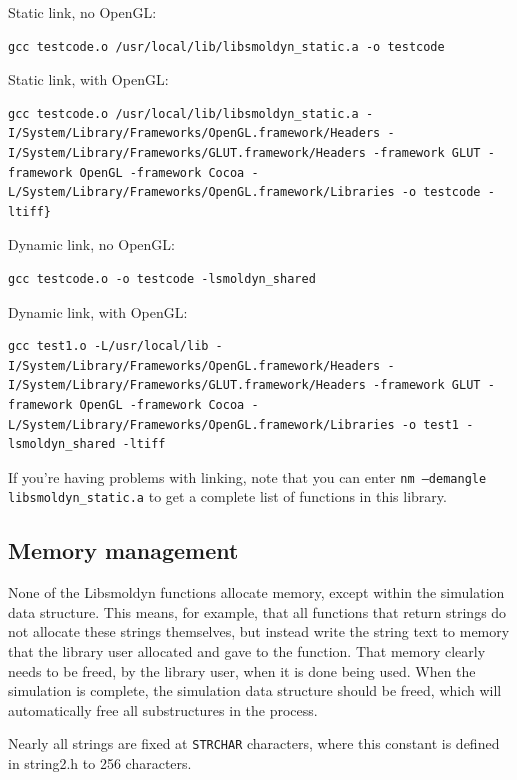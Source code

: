 \documentclass {scrbook}
\newcommand {\ttt} {\texttt}
\begin{document}
Static link, no OpenGL:
\begin{lstlisting}[style=SSAC]
gcc testcode.o /usr/local/lib/libsmoldyn_static.a -o testcode
\end{lstlisting}

Static link, with OpenGL:
\begin{lstlisting}[style=SSAC]
gcc testcode.o /usr/local/lib/libsmoldyn_static.a -I/System/Library/Frameworks/OpenGL.framework/Headers -I/System/Library/Frameworks/GLUT.framework/Headers -framework GLUT -framework OpenGL -framework Cocoa -L/System/Library/Frameworks/OpenGL.framework/Libraries -o testcode -ltiff}
\end{lstlisting}

Dynamic link, no OpenGL:
\begin{lstlisting}[style=SSAC]
gcc testcode.o -o testcode -lsmoldyn_shared
\end{lstlisting}

Dynamic link, with OpenGL:
\begin{lstlisting}[style=SSAC]
gcc test1.o -L/usr/local/lib -I/System/Library/Frameworks/OpenGL.framework/Headers -I/System/Library/Frameworks/GLUT.framework/Headers -framework GLUT -framework OpenGL -framework Cocoa -L/System/Library/Frameworks/OpenGL.framework/Libraries -o test1 -lsmoldyn_shared -ltiff
\end{lstlisting}

If you're having problems with linking, note that you can enter \ttt{nm --demangle libsmoldyn\_static.a} to get a complete list of functions in this library.

\subsection*{Memory management}

None of the Libsmoldyn functions allocate memory, except within the simulation data structure. This means, for example, that all functions that return strings do not allocate these strings themselves, but instead write the string text to memory that the library user allocated and gave to the function. That memory clearly needs to be freed, by the library user, when it is done being used. When the simulation is complete, the simulation data structure should be freed, which will automatically free all substructures in the process.

Nearly all strings are fixed at \ttt{STRCHAR} characters, where this constant is defined in string2.h to 256 characters.
\end{document}

